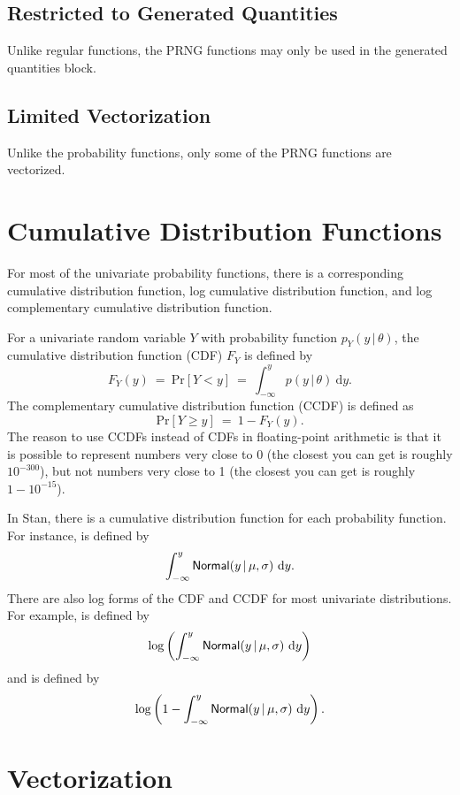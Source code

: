 \subsection{Restricted to Generated Quantities}

Unlike regular functions, the PRNG functions may only be used in the
generated quantities block.

\subsection{Limited Vectorization}

Unlike the probability functions, only some of the PRNG functions are
vectorized.


\section{Cumulative Distribution Functions}

For most of the univariate probability functions, there is a
corresponding cumulative distribution function, log cumulative
distribution function, and log complementary cumulative distribution
function.

For a univariate random variable $Y$ with probability function $p_Y(y \,
| \, \theta)$, the cumulative distribution function (CDF) $F_Y$ is
defined by
\[
F_Y(y)
\ = \
\mbox{Pr}[Y < y]
\ = \
\int_{-\infty}^y p(y \, | \, \theta) \ \mathrm{d}y.
\]
The complementary cumulative distribution function (CCDF) is defined
as
\[
\mbox{Pr}[Y \geq y]
\ = \
1 - F_Y(y).
\]
The reason to use CCDFs instead of CDFs in floating-point arithmetic
is that it is possible to represent numbers very close to 0 (the
closest you can get is roughly $10^{-300}$), but not numbers very close
to 1 (the closest you can get is roughly $1 - 10^{-15}$).

In Stan, there is a cumulative distribution function for each
probability function.  For instance, 
is defined by
%
\[
\int_{-\infty}^y \mbox{\sf Normal}(y \, | \, \mu, \sigma) \ \mathrm{d}y.
\]
%
There are also log forms of the CDF and CCDF for most univariate
distributions.  For example,  is
defined by
%
\[
\log \left( \int_{-\infty}^y \mbox{\sf Normal}(y \, | \, \mu, \sigma) \
  \mathrm{d}y \right)
\]
%
and \code{normal\_lccdf(y | mu,~sigma)} is defined by
%
\[
\log \left( 1 - \int_{-\infty}^y \mbox{\sf Normal}(y \, | \, \mu, \sigma) \
  \mathrm{d}y \right).
\]


\section{Vectorization}\label{vectorization.section}

